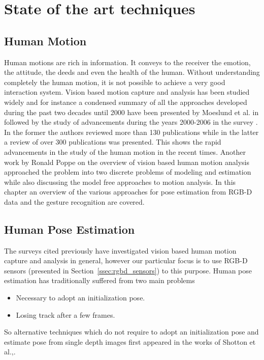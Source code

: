 \chapter{State of the art techniques}
\section{Human Motion} %

\label{Chapter3} %


 Human motions are rich in information. It conveys to the receiver the emotion, the attitude, the deeds and even the health of the human. Without understanding completely the human motion, it is not possible to achieve a very good interaction system.  Vision based motion capture and analysis has been studied widely and for instance a condensed summary of all the approaches developed during the past two decades until 2000 have been presented by Moeslund et al. in \cite{Moeslund2001231} followed by the study of advancements during the years 2000-2006 in the survey \cite{Moeslund200690}. In the former the authors reviewed more than 130 publications while in the latter a review of over 300 publications was presented. This shows the rapid advancements in the study of the human motion in the recent times. Another work by Ronald Poppe\cite{Poppe20074} on the overview of vision based human motion analysis approached the problem into two discrete problems of modeling and estimation while also discussing the model free approaches to motion analysis. In this chapter an overview of the various approaches for pose estimation from RGB-D data and the gesture recognition are covered.
\section{Human Pose Estimation}
\label{sec:humanpose}
  The surveys\cite{Moeslund2001231}\cite{Moeslund200690}\cite{Poppe20074} cited previously have investigated vision based human motion capture and analysis in general, however our particular focus is to use RGB-D sensors (presented in Section~\ref{ssec:rgbd_sensors}) to this purpose. Human pose estimation has traditionally suffered from two main problems
\begin{itemize}
\item Necessary to adopt an initialization pose.
\item Losing track after a few frames.
\end{itemize}
So alternative techniques which do not require to adopt an initialization pose and estimate pose from single depth images first appeared in the works of Shotton et al.,\cite{Shotton2011}.
